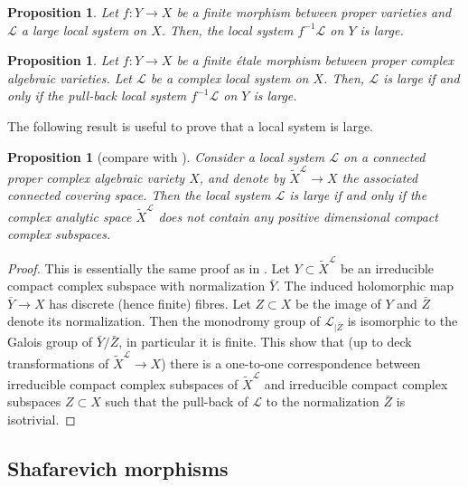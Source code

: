 \documentclass[11pt,letterpaper]{amsart}
\def\cL{\mathcal{L}}
\theoremstyle{plain}
\newtheorem{prop}[thm]{Proposition}
\begin{document}
\begin{prop}\label{pull-back large}
Let $f \colon Y \to X$ be a finite morphism between proper varieties and $\cL$ a large local system on $X$. Then, the local system $f^{-1} \cL$ on $Y$ is large.
\end{prop}


\begin{prop}\label{large local systems and finite étale cover}
Let $f \colon Y \to X$ be a finite étale morphism between proper complex algebraic varieties. Let $\cL$ be a complex local system on $X$. Then, $\cL$ is large if and only if the pull-back local system $f^{-1} \cL$ on $Y$ is large.
\end{prop}

The following result is useful to prove that a local system is large.

\begin{prop}[compare with {\cite[Proposition 2.12]{Kollar-Shafarevich}}]\label{covering associated to a large local system}
Consider a local system $\cL$ on a connected proper complex algebraic variety $X$, and denote by $\tilde{X}^\cL \to X$ the associated connected covering space. Then the local system $\cL$ is large if and only if the complex analytic space $\tilde{X}^\cL$ does not contain any positive dimensional compact complex subspaces.
\end{prop}
\begin{proof} This is essentially the same proof as in {\cite[Proposition 2.12]{Kollar-Shafarevich}}. Let $Y \subset \tilde{X}^\cL$ be an irreducible compact complex subspace with normalization $\bar Y$. The induced holomorphic map $\bar Y \to X$ has discrete (hence finite) fibres. Let $Z \subset X$ be the image of $Y$ and $\bar Z$ denote its normalization. Then the monodromy group of $\cL_{|\bar Z}$ is isomorphic to the Galois group of $\bar Y \slash \bar Z$, in particular it is finite. This show that (up to deck transformations of $ \tilde{X}^\cL \to X$) there is a one-to-one correspondence between irreducible compact complex subspaces of $ \tilde{X}^\cL$ and irreducible  compact complex subspaces $Z \subset X$ such that the pull-back of $\cL$ to the normalization $\bar Z$ is isotrivial.
\end{proof}




\subsection{Shafarevich morphisms}
\end{document}
